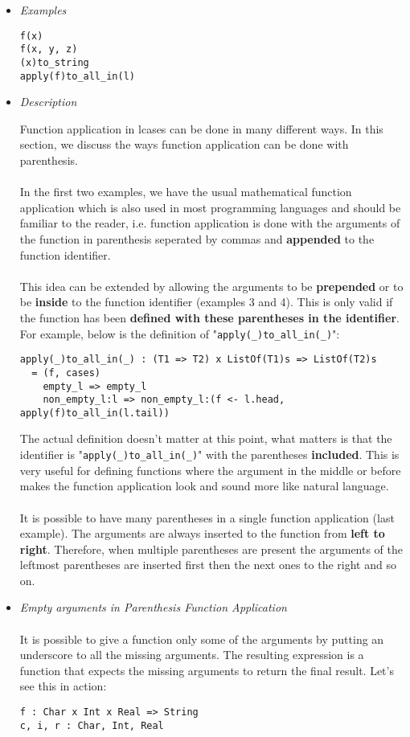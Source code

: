 \documentclass{article}
\begin{document}
\begin{itemize}
\item \textit{Examples}

\begin{verbatim}
f(x)
f(x, y, z)
(x)to_string
apply(f)to_all_in(l)
\end{verbatim}

\item \textit{Description}

Function application in lcases can be done in many different ways. In this
section, we discuss the ways function application can be done with parenthesis.
\\\\
In the first two examples, we have the usual mathematical function application
which is also used in most programming languages and should be familiar to the
reader, i.e. function application is done with the arguments of the function in
parenthesis seperated by commas and \textbf{appended} to the function
identifier.
\\\\
This idea can be extended by allowing the arguments to be \textbf{prepended} or
to be \textbf{inside} to the function identifier (examples 3 and 4). This is
only valid if the function has been \textbf{defined with these parentheses in
the identifier}. For example, below is the definition of
"\verb|apply(_)to_all_in(_)|":

\begin{verbatim}
apply(_)to_all_in(_) : (T1 => T2) x ListOf(T1)s => ListOf(T2)s
  = (f, cases)
    empty_l => empty_l
    non_empty_l:l => non_empty_l:(f <- l.head, apply(f)to_all_in(l.tail))
\end{verbatim}
The actual definition doesn't matter at this point, what matters is that the
identifier is "\verb|apply(_)to_all_in(_)|" with the parentheses
\textbf{included}.  This is very useful for defining functions where the
argument in the middle or before makes the function application look and sound
more like natural language.
\\\\
It is possible to have many parentheses in a single function application (last
example). The arguments are always inserted to the function from \textbf{left
to right}.  Therefore, when multiple parentheses are present the arguments of
the leftmost parentheses are inserted first then the next ones to the right and
so on.

\newpage
\item \textit{Empty arguments in Parenthesis Function Application}
\\\\
It is possible to give a function only some of the arguments by putting an
underscore to all the missing arguments. The resulting expression is a function
that expects the missing arguments to return the final result. Let's see
this in action:
\begin{verbatim}
f : Char x Int x Real => String
c, i, r : Char, Int, Real


\end{verbatim}
\end{itemize}
\end{document}

